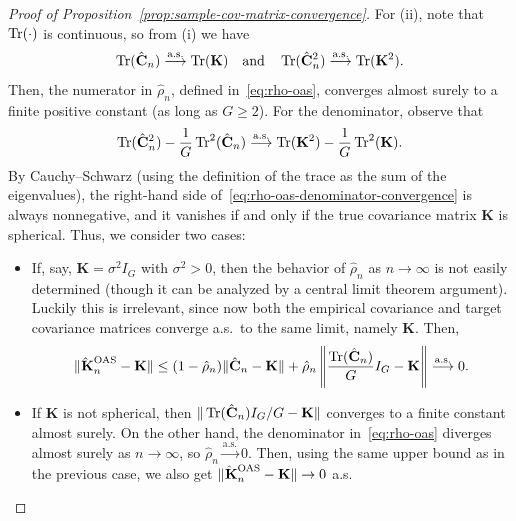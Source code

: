 \begin{proof}[Proof of Proposition~\ref{prop:sample-cov-matrix-convergence}]
  For (ii), note that \(\operatorname{Tr}(\cdot)\) is continuous, so from (i) we have
  \[
  \operatorname{Tr}(\hat{\mathbf C}_n) \stackrel{\text{a.s.}}{\longrightarrow} \operatorname{Tr}(\mathbf K)\quad \text{and}\quad \operatorname{Tr}(\hat{\mathbf C}_n^2) \stackrel{\text{a.s.}}{\longrightarrow} \operatorname{Tr}(\mathbf K^2).
  \]
  Then, the numerator in \(\hat\rho_n\), defined in~\eqref{eq:rho-oas}, converges almost surely to a finite positive constant (as long as \(G\geq 2\)). For the denominator, observe that
  \begin{equation}\label{eq:rho-oas-denominator-convergence}
    \operatorname{Tr}(\hat{\mathbf C}_n^2) - \frac{1}{G}\operatorname{Tr}^2(\hat{\mathbf C}_n) \stackrel{\text{a.s.}}{\longrightarrow} \operatorname{Tr}(\mathbf K^2) - \frac{1}{G}\operatorname{Tr}^2(\mathbf K).
  \end{equation}
  By Cauchy--Schwarz (using the definition of the trace as the sum of the eigenvalues), the right-hand side of~\eqref{eq:rho-oas-denominator-convergence} is always nonnegative, and it vanishes if and only if the true covariance matrix \(\mathbf K\) is spherical. Thus, we consider two cases:
  \begin{itemize}
  \item If, say, \(\mathbf K =\sigma^2 I_G\) with \(\sigma^2>0\), then the behavior of \(\hat \rho_n\) as \(n\to\infty\) is not easily determined (though it can be analyzed by a central limit theorem argument). Luckily this is irrelevant, since now both the empirical covariance and target covariance matrices converge a.s.\ to the same limit, namely \(\mathbf K\). Then,
  \[
  \|\hatbfKnOAS - \mathbf K\| \leq (1-\hat\rho_n) \|\hat{\mathbf C}_n - \mathbf K\| + \hat\rho_n \left\|\frac{\tr(\hat{\mathbf C}_n)}{G}I_G - \mathbf K\right\| \stackrel{\text{a.s.}}{\longrightarrow} 0.
  \]
  \item If \(\mathbf K\) is not spherical, then \(\|\operatorname{Tr}(\hat{\mathbf C}_n)I_G/G - \mathbf K\|\) converges to a finite constant almost surely. On the other hand, the denominator in~\eqref{eq:rho-oas} diverges almost surely as \(n\to\infty\), so \(\hat\rho_n\stackrel{\text{a.s.}}{\to} 0\). Then, using the same upper bound as in the previous case, we also get \(\|\hatbfKnOAS - \mathbf K\|\to 0\) a.s.
  \end{itemize}


\end{proof}

